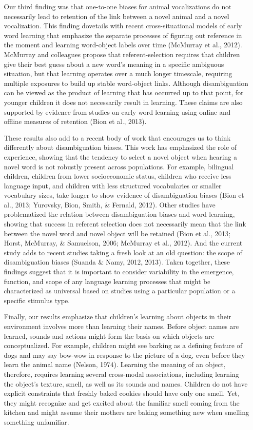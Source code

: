 \documentclass[english,floatsintext,man]{apa6}
\theoremstyle{definition}
\theoremstyle{definition}
\theoremstyle{definition}
\theoremstyle{remark}
\begin{document}
Our third finding was that one-to-one biases for animal vocalizations do
not necessarily lead to retention of the link between a novel animal and
a novel vocalization. This finding dovetails with recent
cross-situational models of early word learning that emphasize the
separate processes of figuring out reference in the moment and learning
word-object labels over time (McMurray et al., 2012). McMurray and
colleagues propose that referent-selection requires that children give
their best guess about a new word's meaning in a specific ambiguous
situation, but that learning operates over a much longer timescale,
requiring multiple exposures to build up stable word-object links.
Although disambiguation can be viewed as the product of learning that
has occurred up to that point, for younger children it does not
necessarily result in learning. These claims are also supported by
evidence from studies on early word learning using online and offline
measures of retention (Bion et al., 2013).

These results also add to a recent body of work that encourages us to
think differently about disambiguation biases. This work has emphasized
the role of experience, showing that the tendency to select a novel
object when hearing a novel word is not robustly present across
populations. For example, bilingual children, children from lower
socioeconomic status, children who receive less language input, and
children with less structured vocabularies or smaller vocabulary sizes,
take longer to show evidence of disambiguation biases (Bion et al.,
2013; Yurovsky, Bion, Smith, \& Fernald, 2012). Other studies have
problematized the relation between disambiguation biases and word
learning, showing that success in referent selection does not
necessarily mean that the link between the novel word and novel object
will be retained (Bion et al., 2013; Horst, McMurray, \& Samuelson,
2006; McMurray et al., 2012). And the current study adds to recent
studies taking a fresh look at an old question: the scope of
disambiguation biases (Suanda \& Namy, 2012, 2013). Taken together,
these findings suggest that it is important to consider variability in
the emergence, function, and scope of any language learning processes
that might be characterized as universal based on studies using a
particular population or a specific stimulus type.

Finally, our results emphasize that children's learning about objects in
their environment involves more than learning their names. Before object
names are learned, sounds and actions might form the basis on which
objects are conceptualized. For example, children might see barking as a
defining feature of dogs and may say bow-wow in response to the picture
of a dog, even before they learn the animal name (Nelson, 1974).
Learning the meaning of an object, therefore, requires learning several
cross-modal associations, including learning the object's texture,
smell, as well as its sounds and names. Children do not have explicit
constraints that freshly baked cookies should have only one smell. Yet,
they might recognize and get excited about the familiar smell coming
from the kitchen and might assume their mothers are baking something new
when smelling something unfamiliar.
\end{document}
